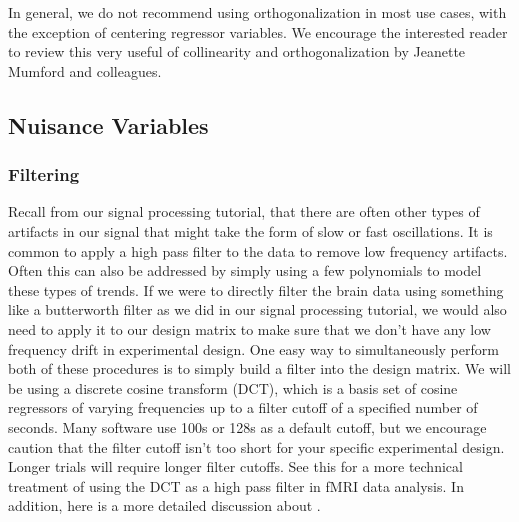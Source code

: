 \documentclass[letterpaper,10pt,english]{sphinxmanual}
\begin{document}

In general, we do not recommend using orthogonalization in most use cases, with the exception of centering regressor variables. We encourage the interested reader to review this very useful  of collinearity and orthogonalization by Jeanette Mumford and colleagues.


\subsection{Nuisance Variables}
\label{\detokenize{content/GLM_Single_Subject_Model:nuisance-variables}}
\begin{sphinxVerbatim}[commandchars=\\\{\}]
   

\end{sphinxVerbatim}

\noindent{}


\subsubsection{Filtering}
\label{\detokenize{content/GLM_Single_Subject_Model:filtering}}
Recall from our signal processing tutorial, that there are often other types of artifacts in our signal that might take the form of slow or fast oscillations. It is common to apply a high pass filter to the data to remove low frequency artifacts. Often this can also be addressed by simply using a few polynomials to model these types of trends. If we were to directly filter the brain data using something like a butterworth filter as we did in our signal processing tutorial, we would also need to apply it to our design matrix to make sure that we don’t have any low frequency drift in experimental design. One easy way to simultaneously perform both of these procedures is to simply build a filter into the design matrix. We will be using a discrete cosine transform (DCT), which is a basis set of cosine regressors of varying frequencies up to a filter cutoff of a specified number of seconds. Many software use 100s or 128s as a default cutoff, but we encourage caution that the filter cutoff isn’t too short for your specific experimental design. Longer trials will require longer filter cutoffs. See this  for a more technical treatment of using the DCT as a high pass filter in fMRI data analysis. In addition, here is a more detailed discussion about .
\end{document}

